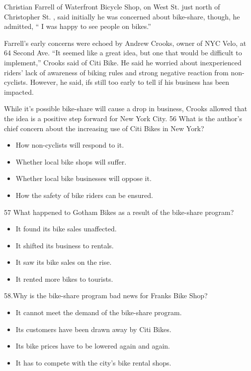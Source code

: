 \documentclass[UTF8,11pt]{ctexart}
\begin{document}
Christian Farrell of Waterfront Bicycle Shop, on West St. just north of Christopher St. , said initially he was concerned about bike-share, though, he admitted, “ I was happy to see people on bikes.”


Farrell’s early concerns were echoed by Andrew Crooks, owner of NYC Velo, at 64 Second Ave. “It seemed like a great idea, but one that would be difficult to implement,” Crooks said of Citi Bike. He said he worried about inexperienced riders’ lack of awareness of biking rules and strong negative reaction from non-cyclists. However, he said, ifs still too early to tell if his business has been impacted.


While it’s possible bike-share will cause a drop in business, Crooks allowed that the idea is a positive step forward for New York City. 56 What is the author’s chief concern about the increasing use of Citi Bikes in New York?


\begin{itemize}[leftmargin=2em,itemsep=.2em,topsep=.4em]\item[A.] How non-cyclists will respond to it.
\item[B.] Whether local bike shops will suffer.
\item[C.] Whether local bike businesses will oppose it.
\item[D.] How the safety of bike riders can be ensured.
\end{itemize}

57 What happened to Gotham Bikes as a result of the bike-share program?


\begin{itemize}[leftmargin=2em,itemsep=.2em,topsep=.4em]\item[A.] It found its bike sales unaffected.
\item[B.] It shifted its business to rentals.
\item[C.] It saw its bike sales on the rise.
\item[D.] It rented more bikes to tourists.
\end{itemize}

58.Why is the bike-share program bad news for Franks Bike Shop?


\begin{itemize}[leftmargin=2em,itemsep=.2em,topsep=.4em]\item[A.] It cannot meet the demand of the bike-share program.
\item[B.] Its customers have been drawn away by Citi Bikes.
\item[C.] Its bike prices have to be lowered again and again.
\item[D.] It has to compete with the city’s bike rental shops.
\end{itemize}
\end{document}
